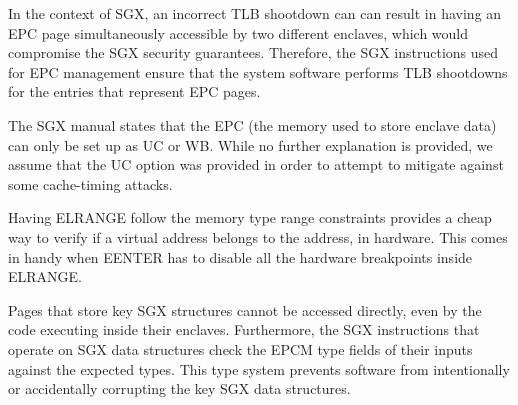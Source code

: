 In the context of SGX, an incorrect TLB shootdown can can result in having an
EPC page simultaneously accessible by two different enclaves, which would
compromise the SGX security guarantees. Therefore, the SGX instructions used
for EPC management ensure that the system software performs TLB shootdowns for
the entries that represent EPC pages.


The SGX manual states that the EPC (the memory used to store enclave data) can
only be set up as UC or WB. While no further explanation is provided, we assume
that the UC option was provided in order to attempt to mitigate against some
cache-timing attacks.


Having ELRANGE follow the memory type range constraints provides a cheap way to
verify if a virtual address belongs to the address, in hardware. This comes in
handy when EENTER has to disable all the hardware breakpoints inside ELRANGE.



Pages that store key SGX structures cannot be accessed directly, even by the
code executing inside their enclaves. Furthermore, the SGX instructions that
operate on SGX data structures check the EPCM type fields of their inputs
against the expected types. This type system prevents software from
intentionally or accidentally corrupting the key SGX data structures.
